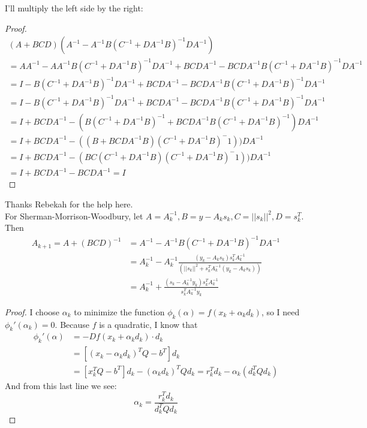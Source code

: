 \documentclass[12pt]{article}
\newenvironment{problem}[2][Problem]{\begin{trivlist}
\item[\hskip \labelsep {\bfseries #1}\hskip \labelsep {\bfseries #2.}]}{\end{trivlist}}
\theoremstyle{definition}
\theoremstyle{definition}
\theoremstyle{definition}
\theoremstyle{definition}
\begin{document}
\begin{problem}{9.15} I'll multiply the left side by the right: 
\begin{proof}
\begin{align*}
(A+BCD)(A^{-1} - A^{-1}B(C^{-1} + DA^{-1}B)^{-1}DA^{-1}) \\
= AA^{-1} - AA^{-1}B(C^{-1} + DA^{-1}B)^{-1}DA^{-1} + BCDA^{-1} - BCDA^{-1}B(C^{-1} + DA^{-1}B)^{-1}DA^{-1} \\
= I - B(C^{-1} + DA^{-1}B)^{-1}DA^{-1} + BCDA^{-1} - BCDA^{-1}B(C^{-1} + DA^{-1}B)^{-1}DA^{-1} \\
= I - B(C^{-1} + DA^{-1}B)^{-1}DA^{-1} + BCDA^{-1} - BCDA^{-1}B(C^{-1} + DA^{-1}B)^{-1}DA^{-1} \\
= I + BCDA^{-1} - (B(C^{-1} + DA^{-1}B)^{-1} + BCDA^{-1}B(C^{-1} + DA^{-1}B)^{-1})DA^{-1} \\
= I + BCDA^{-1} - ((B+BCDA^{-1}B)(C^{-1} + DA^{-1}B)^-{1}))DA^{-1} \\
= I + BCDA^{-1} - (BC(C^{-1}+DA^{-1}B)(C^{-1} + DA^{-1}B)^-{1}))DA^{-1} \\
= I + BCDA^{-1} - BCDA^{-1}
= I
\end{align*}

\end{proof}
\end{problem}

\begin{problem}{9.16}
Thanks Rebekah for the help here. \\
For Sherman-Morrison-Woodbury, let $A = A_k^{-1}, B = y-A_ks_k, C= ||s_k||^2, D = s_k^T.$ Then 
\begin{align*}
A_{k+1} = A+(BCD)^{-1} &= A^{-1} - A^{-1}B(C^{-1} + DA^{-1}B)^{-1}DA^{-1} \\
&= A_k^{-1} - A_k^{-1} \frac{(y_k - A_k s_k)s^T_k A^{-1}_k}{(||s_k||^2 + s^T_k A^{-1}_k (y_k - A_k s_k))} \\
&= A_k^{-1} + \frac{(s_k - A^{-1}_k y_k)s^T_kA^{-1}_k}{s^T_k A^{-1}_k y_k }
\end{align*}  
\end{problem}

\begin{problem}{9.18}
\begin{proof}
I choose $\alpha_k$ to minimize the function $\phi_k(\alpha) = f(x_k + \alpha_k d_k)$, so I need $\phi_k'(\alpha_k) = 0$. Because $f$ is a quadratic, I know that 
\begin{align*}
\phi_k'(\alpha) &= - Df(x_k + \alpha_k d_k) \cdot d_k \\
&=[(x_k - \alpha_k d_k)^T Q - b^T] d_k \\
&= [x_k^TQ - b^T]d_k - (\alpha_kd_k)^TQd_k
= r_k^Td_k - \alpha_k(d_k^TQd_k)
\end{align*}
And from this last line we see:
$$
\alpha_k = \frac{r_k^Td_k}{d_k^TQd_k}
$$
\end{proof}
\end{problem}
\end{document}
